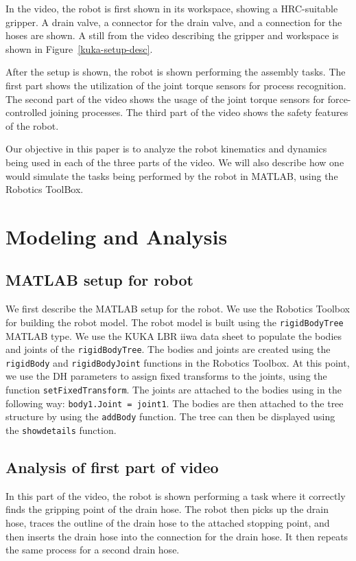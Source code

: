 \documentclass[conference]{IEEEtran}
\begin{document}
In the video, the robot is first shown in its workspace, showing a HRC-suitable
gripper. A drain valve, a connector for the drain valve, and a connection for
the hoses are shown. A still from the video describing the gripper and workspace is shown in Figure~\ref{kuka-setup-desc}.

After the setup is shown, the robot is shown performing the assembly tasks. The first
part shows the utilization of the joint torque sensors for process recognition. The second
part of the video shows the usage of the joint torque sensors for force-controlled
joining processes. The third part of the video shows the safety features of the robot.

Our objective in this paper is to analyze the robot kinematics and dynamics being
used in each of the three parts of the video. We will also describe how one would
simulate the tasks being performed by the robot in MATLAB, using the Robotics
ToolBox.

\section{Modeling and Analysis}

\subsection{MATLAB setup for robot}

We first describe the MATLAB setup for the robot. We use the Robotics Toolbox for
building the robot model. The robot model is built using the \texttt{rigidBodyTree} MATLAB type.
We use the KUKA LBR iiwa data sheet to populate the bodies and joints of the
\texttt{rigidBodyTree}. The bodies and joints are created using the \texttt{rigidBody} and
\texttt{rigidBodyJoint} functions in the Robotics Toolbox. At this point, we use
the DH parameters to assign fixed transforms to the joints, using the function
\texttt{setFixedTransform}.
The joints are attached to the bodies
using in the following way: \texttt{body1.Joint = joint1}. The bodies are then
attached to the tree structure by using the \texttt{addBody} function. The tree
can then be displayed using the \texttt{showdetails} function.
\subsection{Analysis of first part of video}

In this part of the video, the robot is shown performing a task where it correctly
finds the gripping point of the drain hose. The robot then picks up the drain hose,
traces the outline of the drain hose to the attached stopping point, and then inserts
the drain hose into the connection for the drain hose. It then repeats the same process
for a second drain hose.
\end{document}

